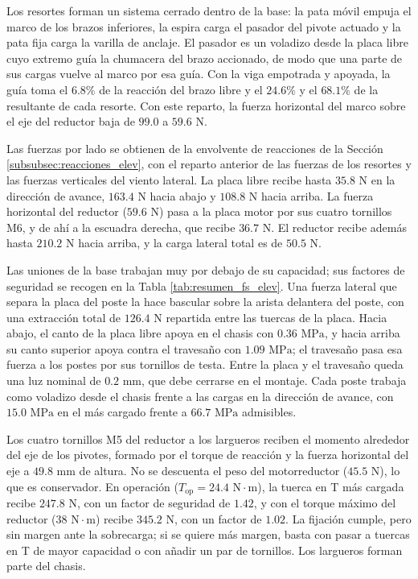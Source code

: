 \documentclass[../../General.tex]{subfiles}
\begin{document}
Los resortes forman un sistema cerrado dentro de la base: la pata móvil empuja el marco de los brazos inferiores, la espira carga el pasador del pivote actuado y la pata fija carga la varilla de anclaje. El pasador es un voladizo desde la placa libre cuyo extremo guía la chumacera del brazo accionado, de modo que una parte de sus cargas vuelve al marco por esa guía. Con la viga empotrada y apoyada, la guía toma el $6.8\%$ de la reacción del brazo libre y el $24.6\%$ y el $68.1\%$ de la resultante de cada resorte. Con este reparto, la fuerza horizontal del marco sobre el eje del reductor baja de $99.0$ a $59.6\text{ N}$.

Las fuerzas por lado se obtienen de la envolvente de reacciones de la Sección \ref{subsubsec:reacciones_elev}, con el reparto anterior de las fuerzas de los resortes y las fuerzas verticales del viento lateral. La placa libre recibe hasta $35.8\text{ N}$ en la dirección de avance, $163.4\text{ N}$ hacia abajo y $108.8\text{ N}$ hacia arriba. La fuerza horizontal del reductor ($59.6\text{ N}$) pasa a la placa motor por sus cuatro tornillos M6, y de ahí a la escuadra derecha, que recibe $36.7\text{ N}$. El reductor recibe además hasta $210.2\text{ N}$ hacia arriba, y la carga lateral total es de $50.5\text{ N}$.

Las uniones de la base trabajan muy por debajo de su capacidad; sus factores de seguridad se recogen en la Tabla \ref{tab:resumen_fs_elev}. Una fuerza lateral que separa la placa del poste la hace bascular sobre la arista delantera del poste, con una extracción total de $126.4\text{ N}$ repartida entre las tuercas de la placa. Hacia abajo, el canto de la placa libre apoya en el chasis con $0.36\text{ MPa}$, y hacia arriba su canto superior apoya contra el travesaño con $1.09\text{ MPa}$; el travesaño pasa esa fuerza a los postes por sus tornillos de testa. Entre la placa y el travesaño queda una luz nominal de $0.2\text{ mm}$, que debe cerrarse en el montaje. Cada poste trabaja como voladizo desde el chasis frente a las cargas en la dirección de avance, con $15.0\text{ MPa}$ en el más cargado frente a $66.7\text{ MPa}$ admisibles.

Los cuatro tornillos M5 del reductor a los largueros reciben el momento alrededor del eje de los pivotes, formado por el torque de reacción y la fuerza horizontal del eje a $49.8\text{ mm}$ de altura. No se descuenta el peso del motorreductor ($45.5\text{ N}$), lo que es conservador. En operación ($T_{\text{op}} = 24.4\text{ N}\cdot\text{m}$), la tuerca en T más cargada recibe $247.8\text{ N}$, con un factor de seguridad de $1.42$, y con el torque máximo del reductor ($38\text{ N}\cdot\text{m}$) recibe $345.2\text{ N}$, con un factor de $1.02$. La fijación cumple, pero sin margen ante la sobrecarga; si se quiere más margen, basta con pasar a tuercas en T de mayor capacidad o con añadir un par de tornillos. Los largueros forman parte del chasis.
\end{document}
